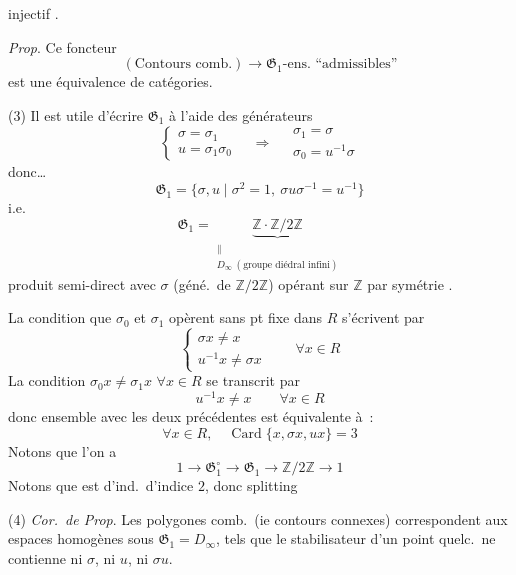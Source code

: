 \documentclass[11pt,a4paper]{article}
\begin{document}
injectif \struck{\ill{}}.

\emph{Prop}. Ce foncteur
\[
  (\text{Contours comb.}) \longrightarrow \mathfrak{G}_1\text{-ens.\ ``admissibles''}
\]
est une équivalence de catégories. 

(3) Il est utile \struck{\ill{}} d'écrire $\mathfrak{G}_1$  à l'aide des générateurs 
\[
  \begin{cases} \sigma = \sigma_1 \\ u = \sigma_1\sigma_0 \end{cases}
  \quad\Longrightarrow\quad
  \begin{array}{l} \sigma_1 = \sigma \\ \sigma_0 = u^{-1}\sigma \end{array}
\]
donc…
\[
  \mathfrak{G}_1 = \{\sigma,u \mid \sigma^{2} = 1,\ \sigma u \sigma^{-1} = u^{-1}\}
\]
i.e.
\[
  \mathfrak{G}_1 = \underbrace{\mathbb{Z}\cdot\mathbb{Z}/2\mathbb{Z}}_{\substack{\| \\ D_\infty\ (\text{groupe diédral infini})}}
\]
produit semi-direct avec $\sigma$ (géné.\ de $\mathbb{Z}/2\mathbb{Z}$) opérant sur $\mathbb{Z}$ par symétrie .

La condition que $\sigma_0$ et $\sigma_1$ opèrent sans pt fixe dans $R$ s'écrivent par
\[
  \left\{\begin{array}{l} \sigma x \neq x \\ u^{-1}x \neq \sigma x \end{array}\right.
  \qquad \forall x \in R
\]
La condition $\sigma_0 x \neq \sigma_1 x$ $\forall x \in R$ se transcrit par
\[
  u^{-1}x \neq x \qquad \forall x \in R
\]
donc ensemble avec les deux précédentes est équivalente à~:
\[
  \forall x \in R, \quad \operatorname{Card}\{x, \sigma x, ux\} = 3
\]
Notons que l'on a
\[
  1 \longrightarrow \mathfrak{G}_1^{\circ} \longrightarrow \mathfrak{G}_1 \longrightarrow \mathbb{Z}/2\mathbb{Z} \longrightarrow 1
\]
Notons que \ill{} est \ill{} d'ind.\ d'indice $2$, donc \ill{} splitting

(4) \emph{Cor.\ de Prop}. Les polygones comb.\ (ie contours connexes) correspondent aux espaces homogènes sous $\mathfrak{G}_1 = D_\infty$, tels que le stabilisateur d'un point quelc.\ ne contienne ni $\sigma$, ni $u$, ni $\sigma u$.
\end{document}
